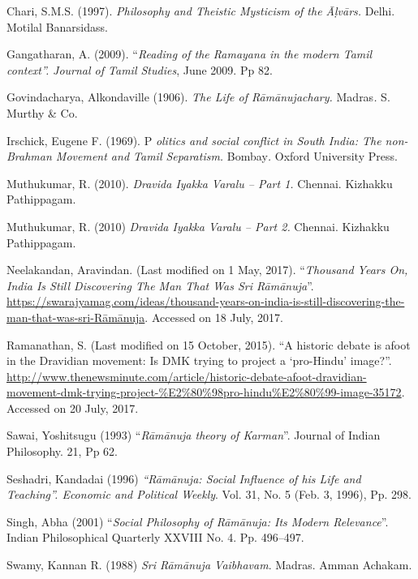 \begin{thebibliography}{99}
 Chari, S.M.S. (1997). \textit{Philosophy and Theistic Mysticism of the Āḷvārs.} Delhi. Motilal Banarsidass.

  Gangatharan, A. (2009). “\textit{Reading of the Ramayana in the modern Tamil context”.} \textit{Journal of Tamil Studies}, June 2009. Pp 82.

  Govindacharya, Alkondaville (1906). \textit{The Life of Rāmānujachary. }Madras\textit{.} S. Murthy \& Co.

  Irschick, Eugene F. (1969). P \textit{olitics and social conflict in South India: The non-Brahman Movement and Tamil Separatism. }Bombay\textit{. }Oxford University Press.

  Muthukumar, R. (2010). \textit{Dravida Iyakka Varalu – Part 1.} Chennai. Kizhakku Pathippagam.

  Muthukumar, R. (2010) \textit{Dravida Iyakka Varalu – Part 2. }Chennai. Kizhakku Pathippagam.

  Neelakandan, Aravindan. (Last modified on 1 May, 2017). “\textit{Thousand Years On, India Is Still Discovering The Man That Was Sri Rāmānuja}”. \url{https://swarajyamag.com/ideas/thousand-years-on-india-is-still-discovering-the-man-that-was-sri-Rāmānuja}. Accessed on 18 July, 2017.

  Ramanathan, S. (Last modified on 15 October, 2015). “A historic debate is afoot in the Dravidian movement: Is DMK trying to project a ‘pro-Hindu’ image?”. \url{http://www.thenewsminute.com/article/historic-debate-afoot-dravidian-movement-dmk-trying-project-%E2%80%98pro-hindu%E2%80%99-image-35172}. Accessed on 20 July, 2017.

  Sawai, Yoshitsugu (1993) “\textit{Rāmānuja theory of Karman}”. Journal of Indian Philosophy. 21, Pp 62.

  Seshadri, Kandadai (1996) \textit{“Rāmānuja: Social Influence of his Life and Teaching”. Economic and Political Weekly}. Vol. 31, No. 5 (Feb. 3, 1996), Pp. 298.

  Singh, Abha (2001) “\textit{Social Philosophy of Rāmānuja: Its Modern Relevance}”. Indian Philosophical Quarterly XXVIII No. 4. Pp. 496–497.

  Swamy, Kannan R. (1988) \textit{Sri Rāmānuja Vaibhavam}. Madras. Amman Achakam.


\end{thebibliography}
